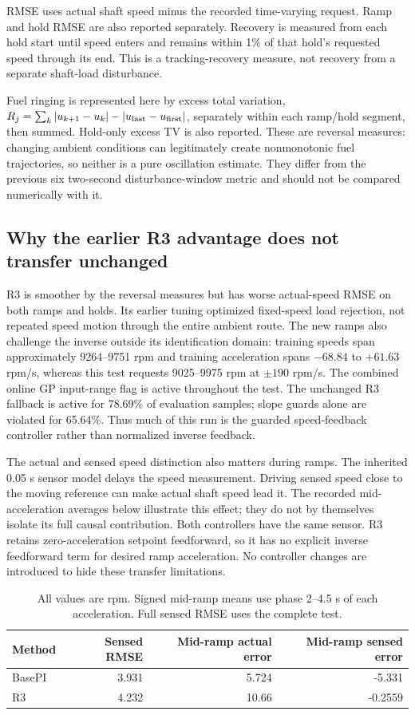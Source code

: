 \documentclass[11pt,a4paper]{article}
\begin{document}
RMSE uses actual shaft speed minus the recorded time-varying request. Ramp and hold RMSE are also reported separately. Recovery is measured from each hold start until speed enters and remains within 1\% of that hold's requested speed through its end. This is a tracking-recovery measure, not recovery from a separate shaft-load disturbance.

Fuel ringing is represented here by excess total variation, $R_j=\sum_k|u_{k+1}-u_k|-|u_{\rm last}-u_{\rm first}|$, separately within each ramp/hold segment, then summed. Hold-only excess TV is also reported. These are reversal measures: changing ambient conditions can legitimately create nonmonotonic fuel trajectories, so neither is a pure oscillation estimate. They differ from the previous six two-second disturbance-window metric and should not be compared numerically with it.
\subsection{Why the earlier R3 advantage does not transfer unchanged}
R3 is smoother by the reversal measures but has worse actual-speed RMSE on both ramps and holds. Its earlier tuning optimized fixed-speed load rejection, not repeated speed motion through the entire ambient route. The new ramps also challenge the inverse outside its identification domain: training speeds span approximately 9264--9751 rpm and training acceleration spans $-68.84$ to $+61.63$ rpm/s, whereas this test requests 9025--9975 rpm at $\pm190$ rpm/s. The combined online GP input-range flag is active throughout the test. The unchanged R3 fallback is active for 78.69\% of evaluation samples; slope guards alone are violated for 65.64\%. Thus much of this run is the guarded speed-feedback controller rather than normalized inverse feedback.

The actual and sensed speed distinction also matters during ramps. The inherited 0.05 s sensor model delays the speed measurement. Driving sensed speed close to the moving reference can make actual shaft speed lead it. The recorded mid-acceleration averages below illustrate this effect; they do not by themselves isolate its full causal contribution. Both controllers have the same sensor. R3 retains zero-acceleration setpoint feedforward, so it has no explicit inverse feedforward term for desired ramp acceleration. No controller changes are introduced to hide these transfer limitations.
\begin{table}[H]\centering\small\begin{tabular}{lrrr}\toprule
Method & Sensed RMSE & Mid-ramp actual error & Mid-ramp sensed error\\\midrule
BasePI & 3.931 & 5.724 & -5.331\\
R3 & 4.232 & 10.66 & -0.2559\\
\bottomrule\end{tabular}\caption{All values are rpm. Signed mid-ramp means use phase 2--4.5 s of each acceleration. Full sensed RMSE uses the complete test.}\end{table}
\end{document}
